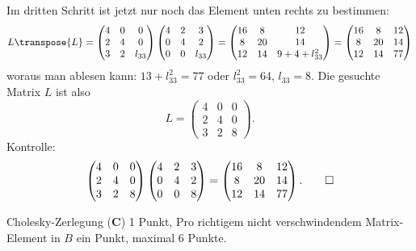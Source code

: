\begin{loesung}
Im dritten Schritt ist jetzt nur noch das Element unten rechts zu bestimmen:
\[
L\transpose{L}=
\begin{pmatrix}
4&0&     0\\
2&4&     0\\
3&2&l_{33}
\end{pmatrix}
\begin{pmatrix}
4&2&     3\\
0&4&     2\\
0&0&l_{33}
\end{pmatrix}
=
\begin{pmatrix}
16& 8& 12\\
 8&20& 14\\
12&14&9+4+l_{33}^2
\end{pmatrix}
=
\begin{pmatrix}
16& 8& 12\\
 8&20& 14\\
12&14& 77
\end{pmatrix}
\]
woraus man ablesen kann: $13+l_{33}^2=77$ oder $l_{33}^2=64$, $l_{33}=8$.
Die gesuchte Matrix $L$ ist also
\[
L=
\begin{pmatrix}
4&0&0\\
2&4&0\\
3&2&8
\end{pmatrix}.
\]
Kontrolle:
\[
\begin{pmatrix}
4&0&0\\
2&4&0\\
3&2&8
\end{pmatrix}
\begin{pmatrix}
4&2&3\\
0&4&2\\
0&0&8
\end{pmatrix}
=
\begin{pmatrix}
16& 8& 12\\
 8&20& 14\\
12&14& 77
\end{pmatrix}.
\qedhere
\]
\end{loesung}

\begin{bewertung}
Cholesky-Zerlegung ({\bf C}) 1 Punkt,
Pro richtigem nicht verschwindendem Matrix-Element in $B$ ein Punkt,
maximal 6 Punkte.
\end{bewertung}

